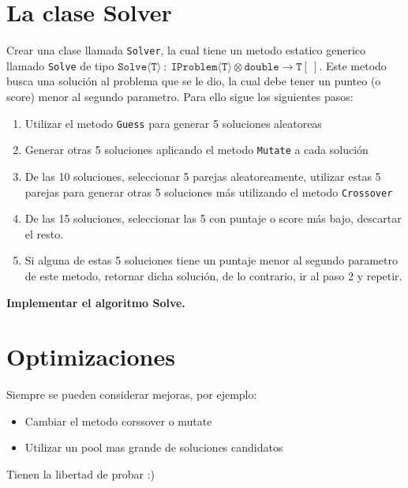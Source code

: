 \documentclass{article}
\begin{document}
\section*{La clase Solver}
Crear una clase llamada \texttt{Solver}, la cual tiene un metodo estatico generico llamado
\texttt{Solve} de tipo $\mathtt{Solve\langle T\rangle}\ :\ \mathtt{IProblem\langle T\rangle}\otimes
\mathtt{double}\rightarrow \mathtt{T}[\ ]$. Este metodo busca una soluci\'on al problema que
se le dio, la cual debe tener un punteo (o score) menor al segundo parametro. Para ello sigue
los siguientes pasos:
\begin{enumerate}
        \item{Utilizar el metodo \texttt{Guess} para generar 5 soluciones aleatoreas}
        \item{Generar otras 5 soluciones aplicando el metodo \texttt{Mutate} a cada soluci\'on}
        \item{De las 10 soluciones, seleccionar 5 parejas aleatoreamente, utilizar estas 5 parejas
        para generar otras 5 soluciones m\'as utilizando el metodo \texttt{Crossover}}
        \item{De las 15 soluciones, seleccionar las 5 con puntaje o score m\'as bajo, descartar
        el resto.}
        \item{Si alguna de estas 5 soluciones tiene un puntaje menor al segundo parametro de
        este metodo, retornar dicha soluci\'on, de lo contrario, ir al paso 2 y repetir.}
\end{enumerate}
{\bf Implementar el algoritmo Solve.}
\section*{Optimizaciones}
Siempre se pueden considerar mejoras, por ejemplo:
\begin{itemize}
        \item{Cambiar el metodo corssover o mutate}
        \item{Utilizar un pool mas grande de soluciones candidatos}
\end{itemize}
Tienen la libertad de probar :)
\end{document}
